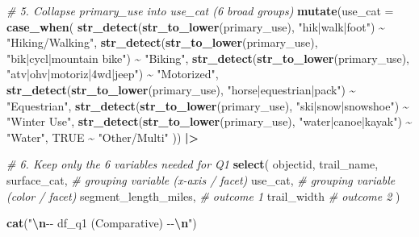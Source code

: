 \documentclass[
]{article}
\newenvironment{Shaded}{\begin{snugshade}}{\end{snugshade}}
\newcommand{\AttributeTok}[1]{\textcolor[rgb]{0.13,0.29,0.53}{#1}}
\newcommand{\CommentTok}[1]{\textcolor[rgb]{0.56,0.35,0.01}{\textit{#1}}}
\newcommand{\ConstantTok}[1]{\textcolor[rgb]{0.56,0.35,0.01}{#1}}
\newcommand{\FunctionTok}[1]{\textcolor[rgb]{0.13,0.29,0.53}{\textbf{#1}}}
\newcommand{\NormalTok}[1]{#1}
\newcommand{\SpecialCharTok}[1]{\textcolor[rgb]{0.81,0.36,0.00}{\textbf{#1}}}
\newcommand{\StringTok}[1]{\textcolor[rgb]{0.31,0.60,0.02}{#1}}
\begin{document}
\begin{Shaded}
\begin{Highlighting}[]
  \CommentTok{\# 5. Collapse primary\_use into use\_cat (6 broad groups)}
  \FunctionTok{mutate}\NormalTok{(}\AttributeTok{use\_cat =} \FunctionTok{case\_when}\NormalTok{(}
    \FunctionTok{str\_detect}\NormalTok{(}\FunctionTok{str\_to\_lower}\NormalTok{(primary\_use), }\StringTok{"hik|walk|foot"}\NormalTok{)               }\SpecialCharTok{\textasciitilde{}} \StringTok{"Hiking/Walking"}\NormalTok{,}
    \FunctionTok{str\_detect}\NormalTok{(}\FunctionTok{str\_to\_lower}\NormalTok{(primary\_use), }\StringTok{"bik|cycl|mountain bike"}\NormalTok{)      }\SpecialCharTok{\textasciitilde{}} \StringTok{"Biking"}\NormalTok{,}
    \FunctionTok{str\_detect}\NormalTok{(}\FunctionTok{str\_to\_lower}\NormalTok{(primary\_use), }\StringTok{"atv|ohv|motoriz|4wd|jeep"}\NormalTok{)    }\SpecialCharTok{\textasciitilde{}} \StringTok{"Motorized"}\NormalTok{,}
    \FunctionTok{str\_detect}\NormalTok{(}\FunctionTok{str\_to\_lower}\NormalTok{(primary\_use), }\StringTok{"horse|equestrian|pack"}\NormalTok{)       }\SpecialCharTok{\textasciitilde{}} \StringTok{"Equestrian"}\NormalTok{,}
    \FunctionTok{str\_detect}\NormalTok{(}\FunctionTok{str\_to\_lower}\NormalTok{(primary\_use), }\StringTok{"ski|snow|snowshoe"}\NormalTok{)           }\SpecialCharTok{\textasciitilde{}} \StringTok{"Winter Use"}\NormalTok{,}
    \FunctionTok{str\_detect}\NormalTok{(}\FunctionTok{str\_to\_lower}\NormalTok{(primary\_use), }\StringTok{"water|canoe|kayak"}\NormalTok{)           }\SpecialCharTok{\textasciitilde{}} \StringTok{"Water"}\NormalTok{,}
    \ConstantTok{TRUE}                                                                  \SpecialCharTok{\textasciitilde{}} \StringTok{"Other/Multi"}
\NormalTok{  )) }\SpecialCharTok{|\textgreater{}}
  
  \CommentTok{\# 6. Keep only the 6 variables needed for Q1}
  \FunctionTok{select}\NormalTok{(}
\NormalTok{    objectid,}
\NormalTok{    trail\_name,}
\NormalTok{    surface\_cat,            }\CommentTok{\# grouping variable (x{-}axis / facet)}
\NormalTok{    use\_cat,                }\CommentTok{\# grouping variable (color / facet)}
\NormalTok{    segment\_length\_miles,   }\CommentTok{\# outcome 1}
\NormalTok{    trail\_width             }\CommentTok{\# outcome 2}
\NormalTok{  )}

\FunctionTok{cat}\NormalTok{(}\StringTok{"}\SpecialCharTok{\textbackslash{}n}\StringTok{{-}{-} df\_q1 (Comparative) {-}{-}}\SpecialCharTok{\textbackslash{}n}\StringTok{"}\NormalTok{)}
\end{Highlighting}
\end{Shaded}
\end{document}
